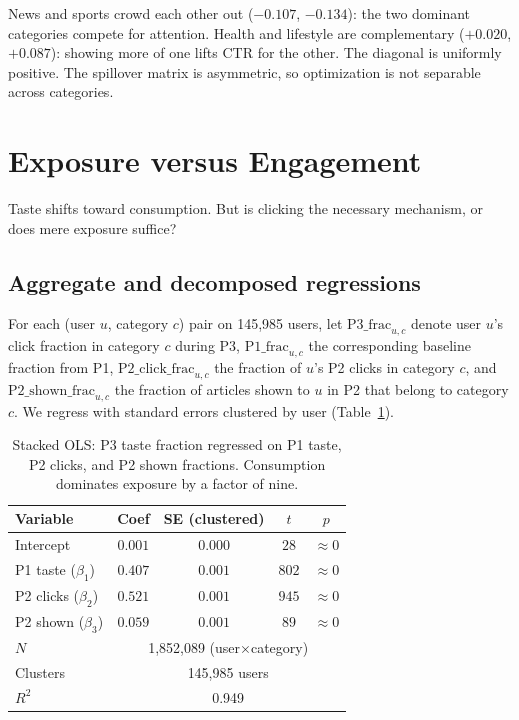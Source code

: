 \documentclass[11pt]{article}
\begin{document}
News and sports crowd each other out ($-0.107$, $-0.134$): the two dominant categories compete for attention. Health and lifestyle are complementary ($+0.020$, $+0.087$): showing more of one lifts CTR for the other. The diagonal is uniformly positive. The spillover matrix is asymmetric, so optimization is not separable across categories.


\section{Exposure versus Engagement}
\label{sec:exposure}

Taste shifts toward consumption. But is clicking the necessary mechanism, or does mere exposure suffice?

\subsection{Aggregate and decomposed regressions}

For each (user $u$, category $c$) pair on 145,985 users, let $\text{P3\_frac}_{u,c}$ denote user $u$'s click fraction in category $c$ during P3, $\text{P1\_frac}_{u,c}$ the corresponding baseline fraction from P1, $\text{P2\_click\_frac}_{u,c}$ the fraction of $u$'s P2 clicks in category $c$, and $\text{P2\_shown\_frac}_{u,c}$ the fraction of articles shown to $u$ in P2 that belong to category $c$. We regress with standard errors clustered by user (Table~\ref{tab:stacked_ols}).

\begin{table}[ht]
\centering
\caption{Stacked OLS: P3 taste fraction regressed on P1 taste, P2 clicks, and P2 shown fractions. Consumption dominates exposure by a factor of nine.}
\label{tab:stacked_ols}
\begin{tabular}{lcccc}
\toprule
Variable & Coef & SE (clustered) & $t$ & $p$ \\
\midrule
Intercept & $0.001$ & $0.000$ & $28$ & $\approx 0$ \\
P1 taste ($\beta_1$) & $0.407$ & $0.001$ & $802$ & $\approx 0$ \\
P2 clicks ($\beta_2$) & $0.521$ & $0.001$ & $945$ & $\approx 0$ \\
P2 shown ($\beta_3$) & $0.059$ & $0.001$ & $89$ & $\approx 0$ \\
\midrule
$N$ & \multicolumn{4}{c}{1,852,089 (user$\times$category)} \\
Clusters & \multicolumn{4}{c}{145,985 users} \\
$R^2$ & \multicolumn{4}{c}{0.949} \\
\bottomrule
\end{tabular}
\end{table}
\FloatBarrier
\end{document}
